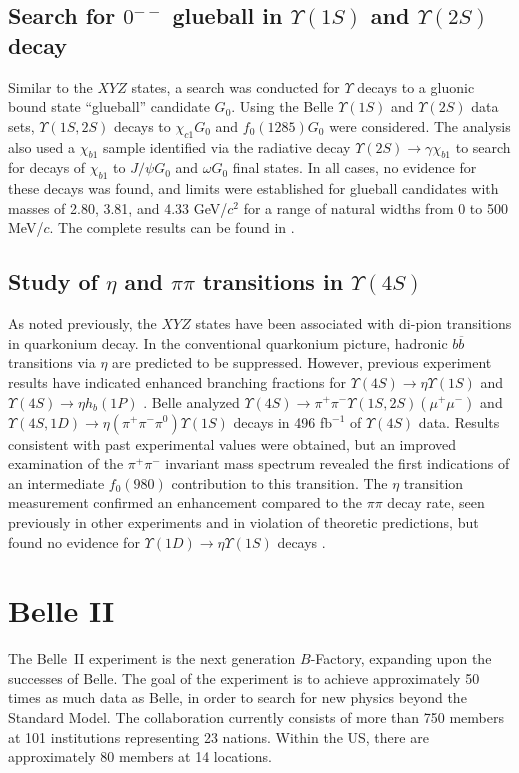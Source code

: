 \documentclass[12pt]{article}
\begin{document}
\subsection{Search for $0^{--}$ glueball in $\Upsilon(1S)$ and $\Upsilon(2S)$ decay}
Similar to the $XYZ$ states, a search was conducted for $\Upsilon$ decays to a gluonic bound state ``glueball'' candidate $G_{0}$. Using the Belle $\Upsilon(1S)$ and $\Upsilon(2S)$ data sets, $\Upsilon(1S,2S)$ decays to $\chi_{c1}G_{0}$ and $f_{0}(1285)G_{0}$ were considered. The analysis also used a $\chi_{b1}$ sample identified via the radiative decay $\Upsilon(2S)\to\gamma\chi_{b1}$ to search for decays of $\chi_{b1}$ to $J/\psi G_{0}$ and $\omega G_{0}$ final states. In all cases, no evidence for these decays was found, and limits were established for glueball candidates with masses of 2.80, 3.81, and 4.33 GeV/$c^{2}$ for a range of natural widths from 0 to 500 MeV/${c}$. The complete results can be found in \cite{g_1s2s}.

\subsection{Study of $\eta$ and $\pi\pi$ transitions in $\Upsilon(4S)$}
As noted previously, the $XYZ$ states have been associated with di-pion transitions in quarkonium decay. In the conventional quarkonium picture, hadronic $b\overline{b}$ transitions via $\eta$ are predicted to be suppressed. However, previous experiment results have indicated enhanced branching fractions for $\Upsilon(4S)\to\eta\Upsilon(1S)$ \cite{bbr_eta} and $\Upsilon(4S)\to\eta h_{b}(1P)$ \cite{bel_eta}. Belle analyzed $\Upsilon(4S)\to\pi^{+}\pi^{-}\Upsilon(1S,2S)(\mu^{+}\mu^{-})$ and $\Upsilon(4S,1D)\to\eta(\pi^{+}\pi^{-}\pi^{0})\Upsilon(1S)$ decays in 496 fb$^{-1}$ of $\Upsilon(4S)$ data. Results consistent with past experimental values were obtained, but an improved examination of the $\pi^{+}\pi^{-}$ invariant mass spectrum revealed the first indications of an intermediate $f_{0}(980)$ contribution to this transition. The $\eta$ transition measurement confirmed an enhancement compared to the $\pi\pi$ decay rate, seen previously in other experiments and in violation of theoretic predictions, but found no evidence for $\Upsilon(1D)\to\eta\Upsilon(1S)$ decays \cite{eta_pipi}.

\section{Belle II}
The Belle~II experiment is the next generation $B$-Factory, expanding upon the successes of Belle. The goal of the experiment is to achieve approximately 50 times as much data as Belle, in order to search for new physics beyond the Standard Model. The collaboration currently consists of more than 750 members at 101 institutions representing 23 nations. Within the US, there are approximately 80 members at 14 locations.
\end{document}
